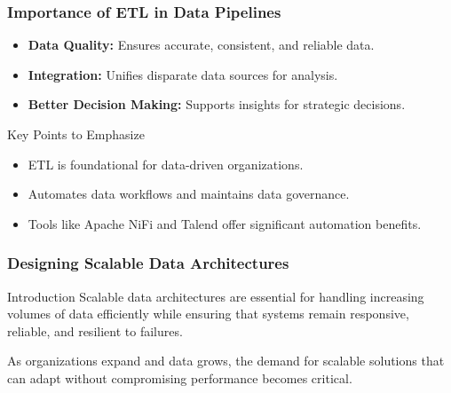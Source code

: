 \documentclass{beamer}
\begin{document}
\begin{frame}[fragile]
    \frametitle{Importance of ETL in Data Pipelines}
    \begin{itemize}
        \item \textbf{Data Quality:} Ensures accurate, consistent, and reliable data.
        \item \textbf{Integration:} Unifies disparate data sources for analysis.
        \item \textbf{Better Decision Making:} Supports insights for strategic decisions.
    \end{itemize}
    \begin{block}{Key Points to Emphasize}
        \begin{itemize}
            \item ETL is foundational for data-driven organizations.
            \item Automates data workflows and maintains data governance.
            \item Tools like Apache NiFi and Talend offer significant automation benefits.
        \end{itemize}
    \end{block}
\end{frame}

\begin{frame}
    \frametitle{Designing Scalable Data Architectures}
    \begin{block}{Introduction}
        Scalable data architectures are essential for handling increasing volumes of data efficiently while ensuring that systems remain responsive, reliable, and resilient to failures. 
    \end{block}
    As organizations expand and data grows, the demand for scalable solutions that can adapt without compromising performance becomes critical.
\end{frame}
\end{document}
